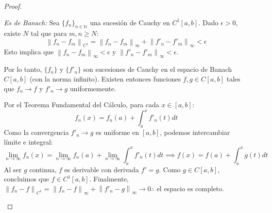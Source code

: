 \documentclass{article}
\theoremstyle{definition}
\newcommand{\N}{\mathbb{N}}
\newcommand{\norm}[1]{\left\lVert #1 \right\rVert}       %
\begin{document}
\begin{proof}
\begin{enumerate}
              \textit{Es de Banach:}
              Sea \( {\{f_n\}}_{n\in\N} \) una sucesión de Cauchy en \( C^1[a,b] \). Dado \( \epsilon>0 \), existe \( N \) tal que para \( m,n \geq N \):
              \[
                  \norm{f_n - f_m}_{C^1} = \norm{f_n - f_m}_\infty + \norm{f'_n - f'_m}_\infty < \epsilon
              \]
              Esto implica que \( \norm{f_n - f_m}_\infty < \epsilon \) y \( \norm{f'_n - f'_m}_\infty < \epsilon \).

              Por lo tanto, \( {\{f_n\}} \) y \( {\{f'_n\}} \) son sucesiones de Cauchy en el espacio de Banach \( C[a,b] \) (con la norma infinito). Existen entonces funciones \( f, g \in C[a,b] \) tales que \( f_n \to f \) y \( f'_n \to g \) uniformemente.

              Por el Teorema Fundamental del Cálculo, para cada \( x \in [a,b] \):
              \[
                  f_n(x) = f_n(a) + \int_a^x f'_n(t) dt
              \]
              Como la convergencia \( f'_n \to g \) es uniforme en \( [a,b] \), podemos intercambiar límite e integral:
              \[
                  \lim_{n\to\infty} f_n(x) = \lim_{n\to\infty} f_n(a) + \lim_{n\to\infty} \int_a^x f'_n(t) dt \implies f(x) = f(a) + \int_a^x g(t) dt
              \]
              Al ser \( g \) continua, \( f \) es derivable con derivada \( f' = g \). Como \( g \in C[a,b] \), concluimos que \( f \in C^1[a,b] \).
              Finalmente, \( \norm{f_n - f}_{C^1} = \norm{f_n - f}_\infty + \norm{f'_n - g}_\infty \to 0  \therefore \) el espacio es completo.
    \end{enumerate}
\end{proof}

\vspace{0.5cm}
\end{document}

